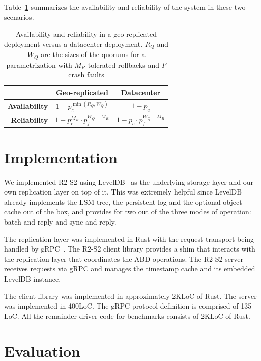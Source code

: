 Table~\ref{tab:parametrization} summarizes the availability and
reliability of the system in these two scenarios.

\begin{table}[ht]
    \centering
    \caption{Availability and reliability in a geo-replicated
    deployment versus a datacenter deployment. $R_Q$ and $W_Q$
    are the sizes of the quorums for a parametrization with $M_R$
    tolerated rollbacks and $F$ crash faults}\label{tab:parametrization}
    \begin{tabular}{|r||c|c|}
        \hline
        & \textbf{Geo-replicated} & \textbf{Datacenter} \\ \hline
        \textbf{Availability} & $1 - p_c^{\min(R_Q, W_Q)}$ & $1 - p_c$ \\ \hline
        \textbf{Reliability}  & $1 - p_c^{M_R} \cdot p_f^{W_Q - M_R}$ & $1 - p_c \cdot p_f^{W_Q - M_R}$ \\ \hline
    \end{tabular}\label{tab:parametrization}
\end{table}


\section{Implementation}\label{sec:r2s2implementation}

We implemented \ac{R2-S2} using LevelDB~\cite{leveldb} as the
underlying storage layer and our own replication layer on top of
it. This was extremely helpful since LevelDB already implements
the \ac{LSM-tree}, the persistent log and the optional object cache
out of the box, and provides for two out of the three modes of
operation: batch and reply and sync and reply.

The replication layer was implemented in Rust with the request transport
being handled by gRPC~\cite{grpc}. The \ac{R2-S2} client library
provides a shim that interacts with the replication layer that
coordinates the \ac{ABD} operations. The \ac{R2-S2} server
receives requests via gRPC and manages the timestamp cache and
its embedded LevelDB instance.

The client library was implemented in approximately 2KLoC of
Rust. The server was implemented in 400LoC. The gRPC protocol
definition is comprised of 135 LoC. All the remainder driver code
for benchmarks consists of 2KLoC of Rust.

\section{Evaluation}\label{sec:r2s2evaluation}

